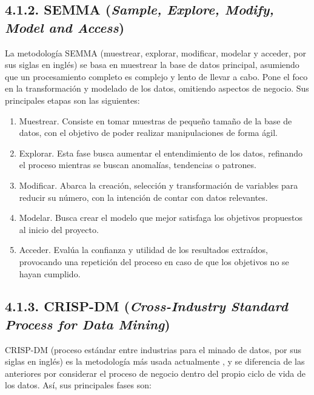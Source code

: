 \subsection{4.1.2. SEMMA (\textit{Sample, Explore, Modify, Model and Access})}

La metodología SEMMA (muestrear, explorar, modificar, modelar y acceder, por sus siglas en inglés) se basa en muestrear la base de datos principal, asumiendo que un procesamiento completo es complejo y lento de llevar a cabo. Pone el foco en la transformación y modelado de los datos, omitiendo aspectos de negocio. Sus principales etapas son las siguientes:

\begin{enumerate}
    \item Muestrear. Consiste en tomar muestras de pequeño tamaño de la base de datos, con el objetivo de poder realizar manipulaciones de forma ágil.
    \item Explorar. Esta fase busca aumentar el entendimiento de los datos, refinando el proceso mientras se buscan anomalías, tendencias o patrones.
    \item Modificar. Abarca la creación, selección y transformación de variables para reducir su número, con la intención de contar con datos relevantes.
    \item Modelar. Busca crear el modelo que mejor satisfaga los objetivos propuestos al inicio del proyecto.
    \item Acceder. Evalúa la confianza y utilidad de los resultados extraídos, provocando una repetición del proceso en caso de que los objetivos no se hayan cumplido.
\end{enumerate}


\subsection{4.1.3. CRISP-DM (\textit{Cross-Industry Standard Process for Data Mining})}

CRISP-DM (proceso estándar entre industrias para el minado de datos, por sus siglas en inglés) es la metodología más usada actualmente \cite{crisp}, y se diferencia de las anteriores por considerar el proceso de negocio dentro del propio ciclo de vida de los datos. Así, sus principales fases son:

